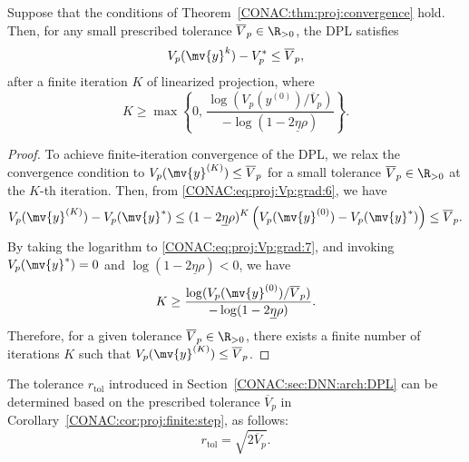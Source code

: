 \begin{cor}
  \label{CONAC:cor:proj:finite:step}
  Suppose that the conditions of Theorem~\ref{CONAC:thm:proj:convergence} hold.
  Then, for any small prescribed tolerance $\overline{V}_p\in\R_{>0}$, the DPL satisfies
  \begin{equation}
    V_p(\mv{y}^{k}) - V_p^*
    \le
    \overline{V}_p
    ,
  \end{equation}
  after a finite iteration $K$ of linearized projection, where
  \begin{equation}
    K
    \ge
    \max\left\{
      0,
      \,
      \frac{
        \log\!\left(V_p(y^{(0)})/\overline{V}_p\right)
      }{
        -\log(1-2\underline{\eta}\rho)
      }
    \right\}.
  \end{equation}
\end{cor}

\begin{proof}

  To achieve finite-iteration convergence of the DPL, we relax the convergence condition to $V_p(\mv{y}^{(K)})\le \overline{V}_p$ for a small tolerance $\overline{V}_p\in\R_{>0}$ at the $K$-th iteration.
  Then, from \eqref{CONAC:eq:proj:Vp:grad:6}, we have
  \begin{equation}
    \label{CONAC:eq:proj:Vp:grad:7}
    V_p(\mv{y}^{(K)}) - V_p(\mv{y}^*)
    \le
    (1-2\underline{\eta}\rho)^K
    \left(
      V_p(\mv{y}^{(0)}) - V_p(\mv{y}^*)    
    \right)
    \le
    \overline{V}_p
    .
  \end{equation}
  By taking the logarithm to \eqref{CONAC:eq:proj:Vp:grad:7}, and invoking $V_p(\mv{y}^*)=0$ and $\log(1-2\underline{\eta}\rho)<0$, we have
  \begin{equation}
    \label{CONAC:eq:proj:Vp:grad:8}
    K
    \ge
    \frac{
      \log(V_p(\mv{y}^{(0)})/\overline{V}_p)
    }{
      -\log(1-2\underline{\eta}\rho)
    }
    .
  \end{equation}
  Therefore, for a given tolerance $\overline{V}_p\in\R_{>0}$, there exists a finite number of iterations $K$ such that $V_p(\mv{y}^{(K)})\le \overline{V}_p$.
\end{proof}

The tolerance $r_\mathrm{tol}$ introduced in Section~\ref{CONAC:sec:DNN:arch:DPL} can be determined based on the prescribed tolerance $\overline{V}_p$ in Corollary~\ref{CONAC:cor:proj:finite:step}, as follows:
\begin{equation}
  \label{CONAC:eq:proj:r:tol}
  r_\mathrm{tol}
  =
  \sqrt{2\overline{V}_p}
  .
\end{equation}

